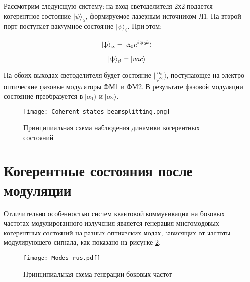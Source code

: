 Рассмотрим следующую систему: на вход светоделителя 2х2 подается когерентное состояние $| \psi \rangle_{\alpha}$, формируемое лазерным источником Л1. На второй порт поступает вакуумное состояние $| \psi \rangle_{\beta}$. При этом:

\begin{equation}
	| \psi \rangle_{\alpha} = | \alpha_{0} e^{i\phi_{0}k} \rangle \\
\end{equation}

\begin{equation}
	| \psi \rangle_{\beta} = | vac \rangle \\
\end{equation}


На обоих выходах светоделителя будет состояние  $| \frac{\alpha_{0}}{\sqrt{2}} \rangle$, поступающее на электро-оптические фазовые модуляторы ФМ1 и ФМ2. В результате фазовой модуляции состояние преобразуется в $| \alpha_{1} \rangle$ и $| \alpha_{2} \rangle$. 


 \begin{figure}[ht]
  \centering
  \texttt{[image: Coherent\_states\_beamsplitting.png]}
  \caption{Принципиальная схема наблюдения динамики когерентных состояний}
  \label{fig:Coherent_states_beamsplitting}
\end{figure}

\pagebreak

\section{Когерентные состояния после модуляции} \label{ch:ch4/sec5}

Отличительно особенностью систем квантовой коммуникации на боковых частотах модулированного излучения является генерация многомодовых когерентных состояний на разных оптических модах, зависящих от частоты модулирующего сигнала, как показано на рисунке \ref{fig:multimodes_q}. 

 \begin{figure}[ht]
  \centering
  \texttt{[image: Modes\_rus.pdf]}
  \caption{Принципиальная схема генерации боковых частот}
  \label{fig:multimodes_q}
\end{figure}


